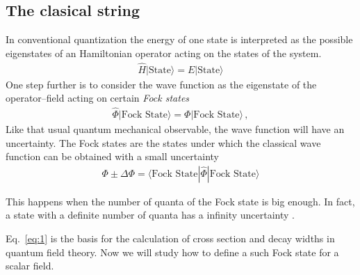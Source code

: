 \subsection{The clasical string}
\label{sec:clasical-string}
\begin{frame}
In conventional quantization the energy of one state is interpreted as the possible eigenstates of an Hamiltonian operator acting on the states of the system. 
\begin{align}
  \widehat{H}|\text{State}\rangle=E|\text{State}\rangle
\end{align}
One step further is to consider the wave function as the eigenstate  of the operator--field acting on certain \emph{Fock states}
\begin{align}
\label{eq:1}
  \widehat{\Phi}|\text{Fock State}\rangle=\Phi|\text{Fock State}\rangle\,,
\end{align}
Like that usual quantum mechanical observable, the wave function will have an uncertainty. 
The Fock states are the states under which the classical wave function can be obtained with a small uncertainty
\begin{align}
    \Phi\pm\Delta\Phi=\langle\text{Fock State}|\widehat{\Phi}|\text{Fock State}\rangle
\end{align}
\end{frame}
This happens when the number of quanta of the Fock state is big enough. In fact, a state with a definite number of quanta has a infinity uncertainty \cite{Gross:1993}.

Eq.~\eqref{eq:1} is the basis for the calculation of cross section and decay widths in quantum field theory. Now we will study how to define a such Fock state for a scalar field.


